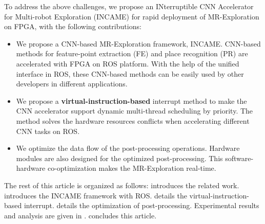 To address the above challenges, we propose an INterruptible CNN Accelerator for Multi-robot Exploration (INCAME) for rapid deployment of MR-Exploration on FPGA, with the following contributions:

\begin{itemize}
\item We propose a CNN-based MR-Exploration framework, INCAME. CNN-based methods for feature-point extraction (FE) and place recognition (PR) are accelerated with FPGA on ROS platform\cite{quigley2009ros}. With the help of the unified interface in ROS, these CNN-based methods can be easily used by other developers in different applications.
\item We propose a \textbf{virtual-instruction-based} interrupt method to make the CNN accelerator support dynamic multi-thread scheduling by priority. The method solves the hardware resources conflicts when accelerating different CNN tasks on ROS.
\item We optimize the data flow of the post-processing operations. Hardware modules are also designed for the optimized post-processing. This software-hardware co-optimization makes the MR-Exploration real-time.
\end{itemize}

The rest of this article is organized as follows:  introduces the related work.  introduces the INCAME framework with ROS.  details the {virtual-instruction-based} interrupt.  details the optimization of post-processing.  Experimental results and analysis are given in .  concludes this article.